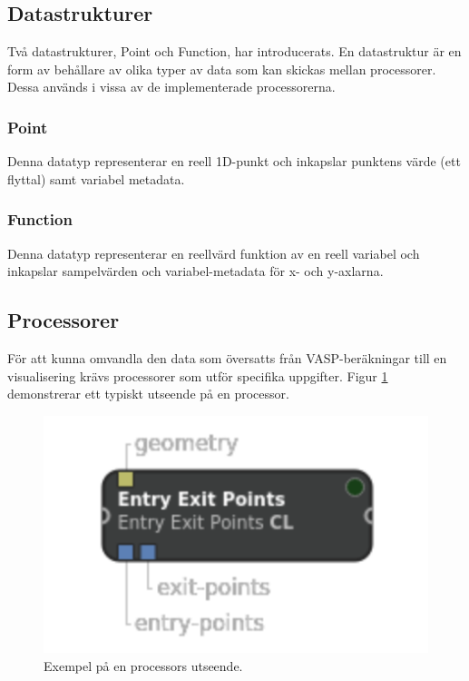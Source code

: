 \documentclass[10pt,oneside,swedish]{article}
\begin{document}
\subsection{Datastrukturer}\label{datastrukturer}

Två datastrukturer, Point och Function, har introducerats. En
datastruktur är en form av behållare av olika typer av data som kan
skickas mellan processorer. Dessa används i vissa av de implementerade
processorerna.

\subsubsection{Point}\label{point}

Denna datatyp representerar en reell 1D-punkt och inkapslar punktens
värde (ett flyttal) samt variabel metadata.

\subsubsection{Function}\label{function}

Denna datatyp representerar en reellvärd funktion av en reell variabel
och inkapslar sampelvärden och variabel-metadata för x- och y-axlarna.

\subsection{Processorer}\label{processorer}

För att kunna omvandla den data som översatts från VASP-beräkningar till
en visualisering krävs processorer som utför specifika uppgifter. Figur
\ref{fig:Processor} demonstrerar ett typiskt utseende på en processor.

\begin{figure}[H]
\centering
\includegraphics[width=1.00000\textwidth]{Images/processor.png}
\caption{Exempel på en processors utseende.}
\label{fig:Processor}
\end{figure}
\end{document}
